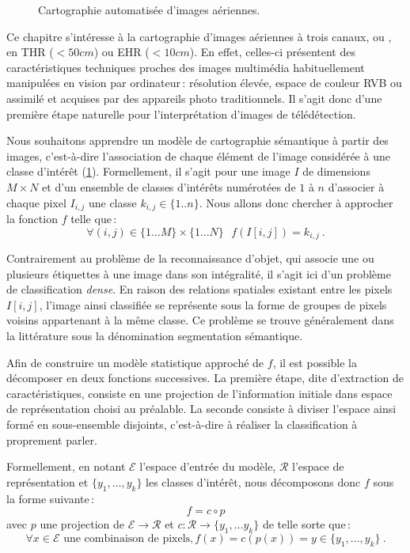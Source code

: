 \begin{figure}[t]
	\resizebox{\textwidth}{!}{}
	\caption{Cartographie automatisée d'images aériennes.}
	\label{fig:semantic_mapping}
\end{figure}

Ce chapitre s'intéresse à la cartographie d'images aériennes à trois canaux,  ou , en \gls{THR} ($<50cm$) ou \gls{EHR} ($<10cm$). En effet, celles-ci présentent des caractéristiques techniques proches des images multimédia habituellement manipulées en vision par ordinateur\,: résolution élevée, espace de couleur \gls{RVB} ou assimilé et acquises par des appareils photo traditionnels. Il s'agit donc d'une première étape naturelle pour l'interprétation d'images de télédétection.

Nous souhaitons apprendre un modèle de cartographie sémantique à partir des images, c'est-à-dire l'association de chaque élément de l'image considérée à une classe d'intérêt (\cref{fig:semantic_mapping}). Formellement, il s'agit pour une image $I$ de dimensions $M \times N$ et d'un ensemble de classes d'intérêts numérotées de $1$ à $n$ d'associer à chaque pixel $I_{i,j}$ une classe $k_{i,j} \in \{1..n\}$. Nous allons donc chercher à approcher la fonction $f$ telle que\,:
\begin{equation}
	\forall (i,j) \in \{1\dots{}M\}\times\{1\dots{}N\}~~~f(I[i,j]) = k_{i,j}~.
\end{equation}

Contrairement au problème de la reconnaissance d'objet, qui associe une ou plusieurs étiquettes à une image dans son intégralité, il s'agit ici d'un problème de classification \emph{dense}. En raison des relations spatiales existant entre les pixels $I[i,j]$, l'image ainsi classifiée se représente sous la forme de groupes de pixels voisins appartenant à la même classe. Ce problème se trouve généralement dans la littérature sous la dénomination \og segmentation sémantique\fg.

Afin de construire un modèle statistique approché de $f$, il est possible la décomposer en deux fonctions successives. La première étape, dite d'extraction de caractéristiques, consiste en une projection de l'information initiale dans espace de représentation choisi au préalable. La seconde consiste à diviser l'espace ainsi formé en sous-ensemble disjoints, c'est-à-dire à réaliser la classification à proprement parler.

Formellement, en notant $\mathcal{E}$ l'espace d'entrée du modèle, $\mathcal{R}$ l'espace de représentation et $\{y_1, \dots, y_k\}$ les classes d'intérêt, nous décomposons donc $f$ sous la forme suivante\,:
\begin{equation}
	f = c \circ p
\end{equation}
avec $p$ une projection de $\mathcal{E} \rightarrow \mathcal{R}$ et $c : \mathcal{R} \rightarrow \{y_1, \dots y_k\}$ de telle sorte que\,:
\begin{equation}
	\forall x \in \mathcal{E} \text{~une combinaison de pixels}, f(x) = c(p(x)) = y \in \{y_1, \dots, y_k\}~.
\end{equation}

